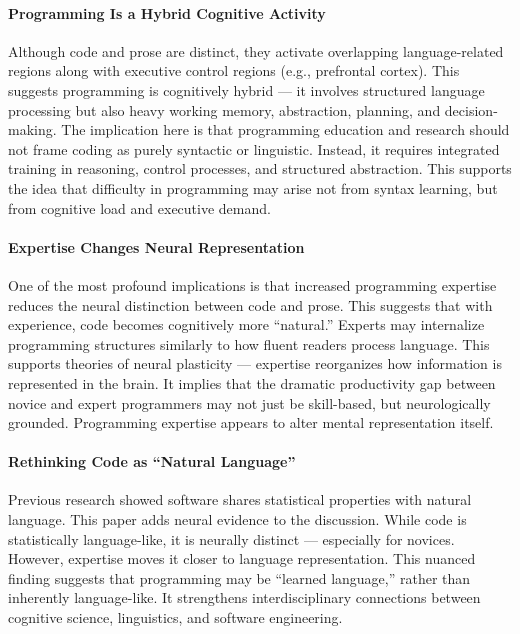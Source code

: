 \paragraph{Programming Is a Hybrid Cognitive Activity} Although code and prose are distinct, they activate overlapping language-related regions along with executive control regions (e.g., prefrontal cortex). This suggests programming is cognitively hybrid — it involves structured language processing but also heavy working memory, abstraction, planning, and decision-making. The implication here is that programming education and research should not frame coding as purely syntactic or linguistic. Instead, it requires integrated training in reasoning, control processes, and structured abstraction. This supports the idea that difficulty in programming may arise not from syntax learning, but from cognitive load and executive demand.
\paragraph{Expertise Changes Neural Representation} One of the most profound implications is that increased programming expertise reduces the neural distinction between code and prose. This suggests that with experience, code becomes cognitively more “natural.” Experts may internalize programming structures similarly to how fluent readers process language. This supports theories of neural plasticity — expertise reorganizes how information is represented in the brain. It implies that the dramatic productivity gap between novice and expert programmers may not just be skill-based, but neurologically grounded. Programming expertise appears to alter mental representation itself.
\paragraph{Rethinking Code as “Natural Language”} Previous research showed software shares statistical properties with natural language. This paper adds neural evidence to the discussion. While code is statistically language-like, it is neurally distinct — especially for novices. However, expertise moves it closer to language representation. This nuanced finding suggests that programming may be “learned language,” rather than inherently language-like. It strengthens interdisciplinary connections between cognitive science, linguistics, and software engineering.